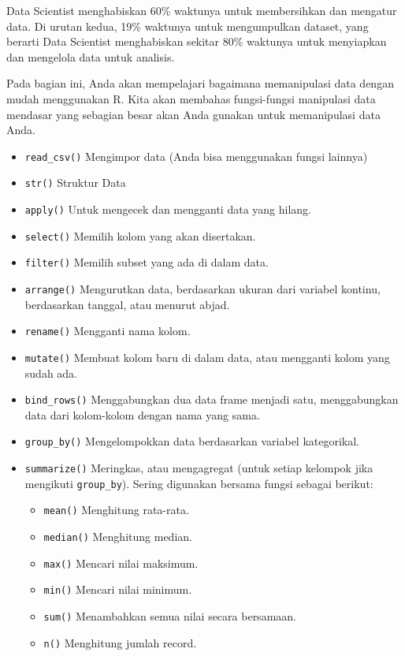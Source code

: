 \documentclass[
]{book}
\providecommand{\tightlist}{%
  \setlength{\itemsep}{0pt}\setlength{\parskip}{0pt}}
\begin{document}
Data Scientist menghabiskan 60\% waktunya untuk membersihkan dan mengatur data. Di urutan kedua, 19\% waktunya untuk mengumpulkan dataset, yang berarti Data Scientist menghabiskan sekitar 80\% waktunya untuk menyiapkan dan mengelola data untuk analisis.

Pada bagian ini, Anda akan mempelajari bagaimana memanipulasi data dengan mudah menggunakan R. Kita akan membahas fungsi-fungsi manipulasi data mendasar yang sebagian besar akan Anda gunakan untuk memanipulasi data Anda.

\begin{itemize}
\tightlist
\item
  \texttt{read\_csv()} Mengimpor data (Anda bisa menggunakan fungsi lainnya)
\item
  \texttt{str()} Struktur Data
\item
  \texttt{apply()} Untuk mengecek dan mengganti data yang hilang.
\item
  \texttt{select()} Memilih kolom yang akan disertakan.
\item
  \texttt{filter()} Memilih subset yang ada di dalam data.
\item
  \texttt{arrange()} Mengurutkan data, berdasarkan ukuran dari variabel kontinu, berdasarkan tanggal, atau menurut abjad.
\item
  \texttt{rename()} Mengganti nama kolom.
\item
  \texttt{mutate()} Membuat kolom baru di dalam data, atau mengganti kolom yang sudah ada.
\item
  \texttt{bind\_rows()} Menggabungkan dua data frame menjadi satu, menggabungkan data dari kolom-kolom dengan nama yang sama.
\item
  \texttt{group\_by()} Mengelompokkan data berdasarkan variabel kategorikal.
\item
  \texttt{summarize()} Meringkas, atau mengagregat (untuk setiap kelompok jika mengikuti \texttt{group\_by}). Sering digunakan bersama fungsi sebagai berikut:

  \begin{itemize}
  \tightlist
  \item
    \texttt{mean()} Menghitung rata-rata.
  \item
    \texttt{median()} Menghitung median.
  \item
    \texttt{max()} Mencari nilai maksimum.
  \item
    \texttt{min()} Mencari nilai minimum.
  \item
    \texttt{sum()} Menambahkan semua nilai secara bersamaan.
  \item
    \texttt{n()} Menghitung jumlah record.
  \end{itemize}
\end{itemize}
\end{document}
